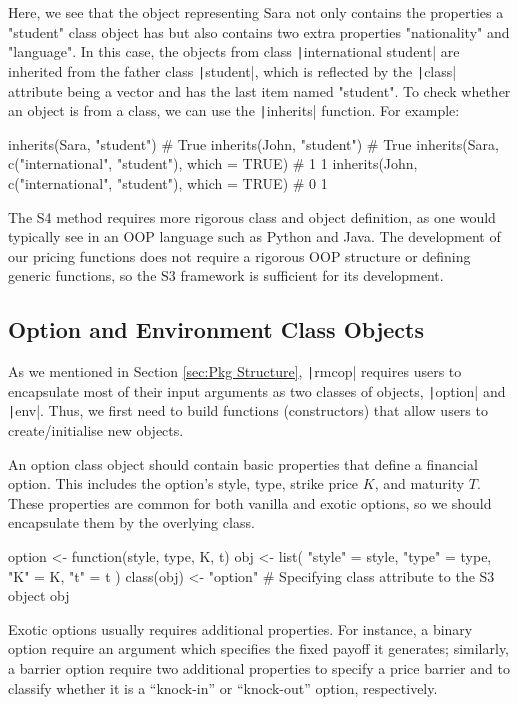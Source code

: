 Here, we see that the object representing Sara not only contains the properties a "student" class object has but also contains two extra properties "nationality" and "language". In this case, the objects from class \texttt|international student| are inherited from the father class \texttt|student|, which is reflected by the \texttt|class| attribute being a vector and has the last item named "student". To check whether an object is from a class, we can use the \texttt|inherits| function. For example:

\begin{Rminted}
inherits(Sara, "student") # True
inherits(John, "student") # True
inherits(Sara, c("international", "student"), which = TRUE) # 1 1
inherits(John, c("international", "student"), which = TRUE) # 0 1
\end{Rminted}

The S4 method requires more rigorous class and object definition, as one would typically see in an OOP language such as Python and Java. The development of our pricing functions does not require a rigorous OOP structure or defining generic functions, so the S3 framework is sufficient for its development.

\subsection{Option and Environment Class Objects}

As we mentioned in Section \ref{sec:Pkg Structure}, \texttt|rmcop| requires users to encapsulate most of their input arguments as two classes of objects, \texttt|option| and \texttt|env|. Thus, we first need to build functions (constructors) that allow users to create/initialise new objects.

An option class object should contain basic properties that define a financial option. This includes the option's style, type, strike price $K$, and maturity $T$. These properties are common for both vanilla and exotic options, so we should encapsulate them by the overlying class.

\begin{Rminted}
option <- function(style, type, K, t) {
    obj <- list(
        "style" = style,
        "type" = type,
        "K" = K,
        "t" = t
    )
    class(obj) <- "option" # Specifying class attribute to the S3 object
    obj
}
\end{Rminted}

Exotic options usually requires additional properties. For instance, a binary option require an argument which specifies the fixed payoff it generates; similarly, a barrier option require two additional properties to specify a price barrier and to classify whether it is a ``knock-in'' or ``knock-out'' option, respectively.

